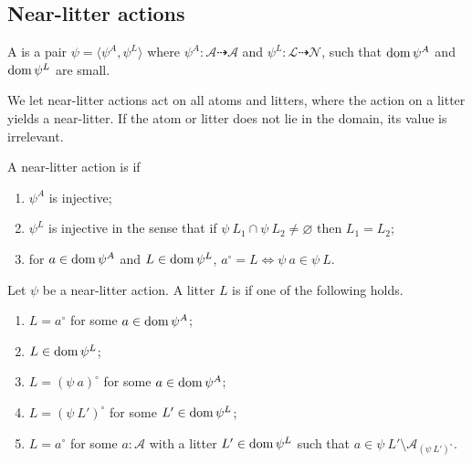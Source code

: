 \subsection{Near-litter actions}

\begin{definition}
    A  is a pair \( \psi = \langle \psi^A, \psi^L \rangle \) where \( \psi^A : \mathcal A \rightdasharrow \mathcal A \) and \( \psi^L : \mathcal L \rightdasharrow \mathcal N \), such that \( \operatorname{dom} \psi^A \) and \( \operatorname{dom} \psi^L \) are small.
\end{definition}
We let near-litter actions act on all atoms and litters, where the action on a litter yields a near-litter.
If the atom or litter does not lie in the domain, its value is irrelevant.
\begin{definition}
    A near-litter action is  if
    \begin{enumerate}
        \item \( \psi^A \) is injective;
        \item \( \psi^L \) is injective in the sense that if \( \psi\ L_1 \cap \psi\ L_2 \neq \varnothing \) then \( L_1 = L_2 \);
        \item for \( a \in \operatorname{dom} \psi^A \) and \( L \in \operatorname{dom} \psi^L \), \( a^\circ = L \Leftrightarrow \psi\ a \in \psi\ L \).
    \end{enumerate}
\end{definition}
\begin{definition}
    Let \( \psi \) be a near-litter action.
    A litter \( L \) is  if one of the following holds.
    \begin{enumerate}
        \item \( L = a^\circ \) for some \( a \in \operatorname{dom} \psi^A \);
        \item \( L \in \operatorname{dom} \psi^L \);
        \item \( L = (\psi\ a)^\circ \) for some \( a \in \operatorname{dom} \psi^A \);
        \item \( L = (\psi\ L')^\circ \) for some \( L' \in \operatorname{dom} \psi^L \);
        \item \( L = a^\circ \) for some \( a : \mathcal A \) with a litter \( L' \in \operatorname{dom} \psi^L \) such that \( a \in \psi\ L' \setminus \mathcal A_{(\psi\ L')^\circ} \).
    \end{enumerate}
\end{definition}
